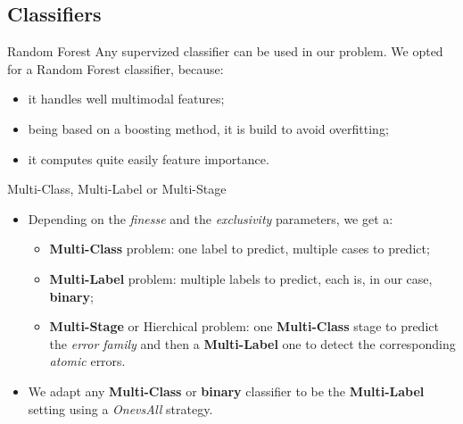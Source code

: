 \documentclass{beamer}
\begin{document}
        \subsection{Classifiers}
            \begin{frame}{Random Forest}
                Any supervized classifier can be used in our problem. We opted for a Random Forest classifier, because:
                \begin{itemize}[label=$\blacktriangleright$, font=\color{IGNGreen}]
                    \item<1-> it handles well multimodal features;
                    \item<2-> being based on a boosting method, it is build to avoid overfitting;
                    \item<3-> it computes quite easily feature importance.
                \end{itemize}
            \end{frame}
            \begin{frame}{Multi-Class, Multi-Label or Multi-Stage}
                \begin{itemize}[label=$\blacktriangleright$, font=\color{IGNGreen}]
                    \item<1-> Depending on the \emph{finesse} and the \emph{exclusivity} parameters, we get a:
                    \begin{itemize}[label=--]
                        \item<2-> \textbf{Multi-Class} problem: one label to predict, multiple cases to predict;
                        \item<3-> \textbf{Multi-Label} problem: multiple labels to predict, each is, in our case, \textbf{binary};
                        \item<3-> \textbf{Multi-Stage} or Hierchical problem: one \textbf{Multi-Class} stage to predict the \emph{error family} and then a \textbf{Multi-Label} one to detect the corresponding \emph{atomic} errors.
                    \end{itemize}
                    \item<4-> We adapt any \textbf{Multi-Class} or \textbf{binary} classifier to be the \textbf{Multi-Label} setting using a \emph{OnevsAll} strategy.
                \end{itemize}
            \end{frame}
\end{document}
